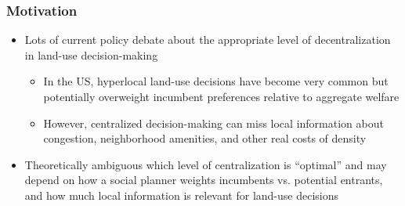 
\begin{frame}
    \frametitle{Motivation}

    \begin{itemize}
        \item Lots of current policy debate about the appropriate level of decentralization in land-use decision-making
        \begin{itemize}
            \item In the US, hyperlocal land-use decisions have become very common but potentially overweight incumbent preferences relative to aggregate welfare
            \citep{fischel_homevoter_2009,ortalo-magne_political_2014,been_urban_2014, khan_decentralized_2021,fang_homeowner_2023,mast_warding_2024}
            \item However, centralized decision-making can miss local information about congestion, neighborhood amenities, and other real costs of density \cite{jacobs_life_1961,gyourko_distaste_2024}
        \end{itemize}
        \item Theoretically ambiguous which level of centralization is ``optimal'' and may depend on how a social planner weights incumbents vs. potential entrants, and how much local information is relevant for land-use decisions
    \end{itemize}
\end{frame}


